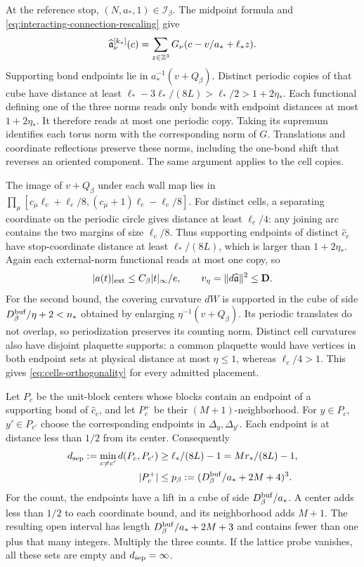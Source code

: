 At the reference stop, $(N,a_*,1)\in\mathcal I_\beta$.
The midpoint formula and
\eqref{eq:interacting-connection-rescaling} give
\[
 \widehat{\mathfrak a}^{[k_*]}_\nu(c)
       =\sum_{z\in\mathbb Z^3}G_\nu(c-v/a_*+\ell_*z).
\]
Supporting bond endpoints lie in
$a_*^{-1}(v+Q_\beta)$.
Distinct periodic copies of that cube have
distance at least
$\ell_*-3\ell_*/(8L)>\ell_*/2>1+2\eta_*$.
Each functional defining one of the three
norms reads only bonds with endpoint distances
at most $1+2\eta_*$. It therefore reads
at most one periodic copy. Taking its
supremum identifies each torus norm with
the corresponding norm of $G$.
Translations and coordinate reflections
preserve these norms, including the one-bond
shift that reverses an oriented component.
The same argument applies to the cell copies.

The image of $v+Q_\beta$ under each wall map
lies in
$\prod_\mu[c_\mu\ell_c+\ell_c/8,(c_\mu+1)\ell_c-\ell_c/8]$.
For distinct cells, a separating coordinate
on the periodic circle gives distance
at least $\ell_c/4$: any joining arc
contains the two margins of size $\ell_c/8$.
Thus supporting endpoints of distinct
$\widehat c_c$ have stop-coordinate distance
at least $\ell_*/(8L)$, which is larger
than $1+2\eta_*$. Again each external-norm
functional reads at most one copy, so
\begin{equation}\label{eq:interacting-external-probe-bound}
 |a(t)|_{\rm ext}\le C_\beta|t|_\infty/e,\qquad
                 v_\eta=\|d\widehat{\mathfrak a}\|^2\le\mathbf D.
\end{equation}
For the second bound, the covering curvature
$dW$ is supported in the cube of side
$D_\beta^{\rm buf}/\eta+2<n_*$
obtained by enlarging $\eta^{-1}(v+Q_\beta)$.
Its periodic translates do not overlap,
so periodization preserves its counting
norm. Distinct cell curvatures also have
disjoint plaquette supports: a common
plaquette would have vertices in both
endpoint sets at physical distance at
most $\eta\le1$, whereas $\ell_c/4>1$.
This gives \eqref{eq:cells-orthogonality}
for every admitted placement.

Let $P_c$ be the unit-block centers whose
blocks contain an endpoint of a supporting
bond of $\widehat c_c$, and let $P_c^+$
be their $(M+1)$-neighborhood.
For $y\in P_c$, $y'\in P_{c'}$ choose the
corresponding endpoints in $\Delta_y,\Delta_{y'}$.
Each endpoint is at distance less than $1/2$
from its center. Consequently
\begin{align}
 d_{\rm sep}:=\min_{c\ne c'}d(P_c,P_{c'})
    &\ge\ell_*/(8L)-1=Mr_*/(8L)-1,
                              \label{eq:interacting-probe-separation}\\
 |P_c^+|&\le p_\beta:=
                  (D_\beta^{\rm buf}/a_*+2M+4)^3 .
                              \label{eq:interacting-support-number}
\end{align}
For the count, the endpoints have a lift in
a cube of side $D_\beta^{\rm buf}/a_*$.
A center adds less than $1/2$ to each
coordinate bound, and its neighborhood adds
$M+1$. The resulting open interval has
length $D_\beta^{\rm buf}/a_*+2M+3$
and contains fewer than one plus that
many integers. Multiply the three counts.
If the lattice probe vanishes, all these
sets are empty and $d_{\rm sep}=\infty$.

